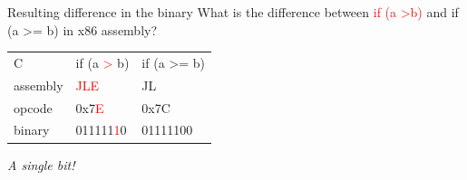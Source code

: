 \documentclass[11pt]{beamer}
\begin{document}
\begin{frame}{Resulting difference in the binary}
What is the difference between \textcolor{red}{if (a \textgreater b)} and \textcolor{mygreen}{if (a \textgreater= b)} in x86 assembly? 
\begin{flushleft}
\begin{table}[]
\begin{tabular}{| l | l | l |}
\hline
C        & if (a \textcolor{red}{\textgreater} b) & if (a \textcolor{mygreen}{\textgreater=} b)   \\
assembly & \textcolor{red}{JLE}                   & \textcolor{mygreen}{JL}                       \\
opcode   & 0x7\textcolor{red}{E}                  & 0x7\textcolor{mygreen}{C}                     \\
binary   & 011111\textcolor{red}{1}0              & 011111\textcolor{mygreen}{0}0                 \\
\hline
\end{tabular}
\end{table}
\end{flushleft}
\emph{A single bit!}
\end{frame}
\end{document}
